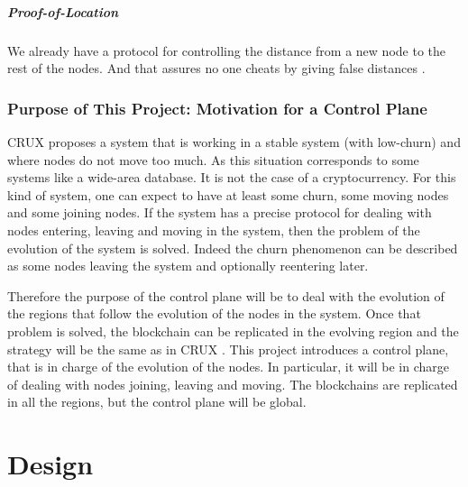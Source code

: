 \documentclass[a4paper,11pt,oneside]{report}
\begin{document}
\paragraph{Proof-of-Location} We already have a protocol for controlling the
distance from a new node to the rest of the nodes. And that assures no one
cheats by giving false distances \cite{Kall2019}. 


\subsection{Purpose of This Project: Motivation for a Control Plane}

CRUX \cite{Basescu2014} proposes a system that is working in a stable system
(with low-churn) and where nodes do not move too much. As this situation
corresponds to some systems like a wide-area database. It is not
the case of a cryptocurrency. For this kind of system, one can expect to have
at least some churn, some moving nodes and some joining nodes. If the
system has a precise protocol for dealing with nodes entering, leaving and
moving in the system, then the problem of the evolution of the system is
solved. Indeed the churn phenomenon can be described as some nodes leaving the
system and optionally reentering later. 

Therefore the purpose of the control plane will be to deal with the evolution
of the regions that follow the evolution of the nodes in the system. Once that
problem is solved, the blockchain can be replicated in the evolving region and
the strategy will be the same as in CRUX \cite{Basescu2014}. This project
introduces a control plane, that is in charge of the evolution of the nodes. In
particular, it will be in charge of dealing with nodes joining, leaving and
moving. The blockchains are replicated in all the regions, but the control
plane will be global. 

\chapter{Design} \label{chap:Design} %
\end{document}
